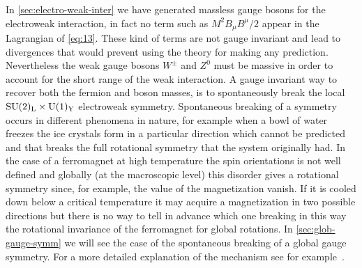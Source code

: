 In \cref{sec:electro-weak-inter} we have generated massless gauge bosons for the
electroweak interaction, in fact no term such as $M^{2} B_{\mu}B^{\mu} / 2$
appear in the Lagrangian of \cref{eq:13}. These kind of terms are not gauge
invariant and lead to divergences that would prevent using the theory for making
any prediction. Nevertheless the weak gauge bosons $W^\pm$ and $Z^0$ must be
massive in order to account for the short range of the weak interaction. A gauge
invariant way to recover both the fermion and boson masses, is to spontaneously
break the local $\mathrm{SU}(2)_\mathrm{L} \times \mathrm{U}(1)_\mathrm{Y}$ electroweak symmetry. Spontaneous
breaking of a symmetry occurs in different phenomena in nature, for example when
a bowl of water freezes the ice crystals form in a particular direction which
cannot be predicted and that breaks the full rotational symmetry that the system
originally had. In the case of a ferromagnet at high temperature the spin
orientations is not well defined and globally (at the macroscopic level) this
disorder gives a rotational symmetry since, for example, the value of the
magnetization vanish. If it is cooled down below a critical temperature it may
acquire a magnetization in two possible directions but there is no way to tell
in advance which one breaking in this way the rotational invariance of the
ferromagnet for global rotations. In \cref{sec:glob-gauge-symm} we will see the
case of the spontaneous breaking of a global gauge symmetry. For a more detailed
explanation of the mechanism see for example~\cite{martin:particle}.

